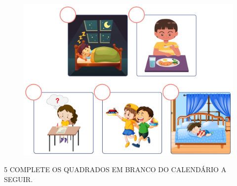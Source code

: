 \begin{figure}[htpb!]
\centering
\includegraphics[width=\textwidth]{../ilustracoes/MAT1/SAEB_1ANO_MAT_FIGURA52.png}
\end{figure}


\num{5} COMPLETE OS QUADRADOS EM BRANCO DO CALENDÁRIO A SEGUIR.

